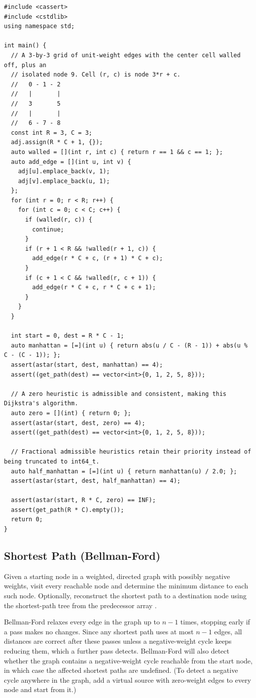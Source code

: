\begin{lstlisting}[style=cpp]
#include <cassert>
#include <cstdlib>
using namespace std;

int main() {
  // A 3-by-3 grid of unit-weight edges with the center cell walled off, plus an
  // isolated node 9. Cell (r, c) is node 3*r + c.
  //   0 - 1 - 2
  //   |       |
  //   3       5
  //   |       |
  //   6 - 7 - 8
  const int R = 3, C = 3;
  adj.assign(R * C + 1, {});
  auto walled = [](int r, int c) { return r == 1 && c == 1; };
  auto add_edge = [](int u, int v) {
    adj[u].emplace_back(v, 1);
    adj[v].emplace_back(u, 1);
  };
  for (int r = 0; r < R; r++) {
    for (int c = 0; c < C; c++) {
      if (walled(r, c)) {
        continue;
      }
      if (r + 1 < R && !walled(r + 1, c)) {
        add_edge(r * C + c, (r + 1) * C + c);
      }
      if (c + 1 < C && !walled(r, c + 1)) {
        add_edge(r * C + c, r * C + c + 1);
      }
    }
  }

  int start = 0, dest = R * C - 1;
  auto manhattan = [=](int u) { return abs(u / C - (R - 1)) + abs(u % C - (C - 1)); };
  assert(astar(start, dest, manhattan) == 4);
  assert((get_path(dest) == vector<int>{0, 1, 2, 5, 8}));

  // A zero heuristic is admissible and consistent, making this Dijkstra's algorithm.
  auto zero = [](int) { return 0; };
  assert(astar(start, dest, zero) == 4);
  assert((get_path(dest) == vector<int>{0, 1, 2, 5, 8}));

  // Fractional admissible heuristics retain their priority instead of being truncated to int64_t.
  auto half_manhattan = [=](int u) { return manhattan(u) / 2.0; };
  assert(astar(start, dest, half_manhattan) == 4);

  assert(astar(start, R * C, zero) == INF);
  assert(get_path(R * C).empty());
  return 0;
}
\end{lstlisting}
\subsection{Shortest Path (Bellman-Ford)}
\label{sec:4.3.5}
Given a starting node in a weighted, directed graph with possibly negative weights, visit every reachable node and determine the minimum distance to each such node. Optionally, reconstruct the shortest path to a destination node using the shortest-path tree from the predecessor array .

Bellman-Ford relaxes every edge in the graph up to $n - 1$ times, stopping early if a pass makes no changes. Since any shortest path uses at most $n - 1$ edges, all distances are correct after these passes unless a negative-weight cycle keeps reducing them, which a further pass detects. Bellman-Ford will also detect whether the graph contains a negative-weight cycle reachable from the start node, in which case the affected shortest paths are undefined. (To detect a negative cycle anywhere in the graph, add a virtual source with zero-weight edges to every node and start from it.)


